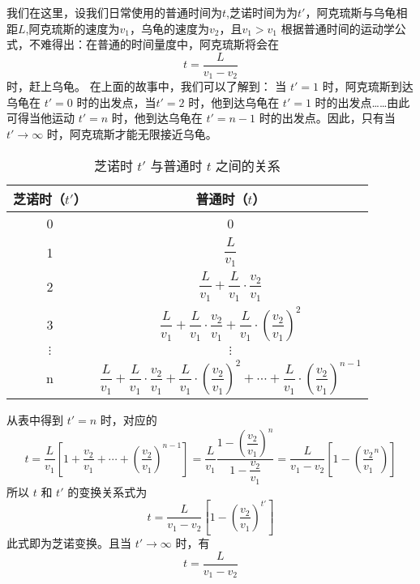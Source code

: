 我们在这里，设我们日常使用的普通时间为$t$,芝诺时间为为$t'$，阿克琉斯与乌龟相距$L$,阿克琉斯的速度为$v_1$，乌龟的速度为$v_2$，且$v_1>v_1$
根据普通时间的运动学公式，不难得出：在普通的时间量度中，阿克琉斯将会在
\begin{equation}
t = \dfrac{L}{v_1 - v_2}
\end{equation}
时，赶上乌龟。
在上面的故事中，我们可以了解到：
当 $t'=1$ 时，阿克琉斯到达乌龟在 $t'=0$ 时的出发点，当$t'=2$ 时，他到达乌龟在 $t'=1$ 时的出发点……由此可得当他运动 $t'=n$ 时，他到达乌龟在 $t'=n-1$ 时的出发点。因此，只有当 $t'\to\infty$ 时，阿克琉斯才能无限接近乌龟。\begin{table}[ht]
\centering
\caption{芝诺时 $t'$ 与普通时 $t$ 之间的关系}\label{zeno_tab1}
\begin{tabular}{|c|c|}
\hline
芝诺时（$t'$） & 普通时（$t$） \\
\hline
0 & 0 \\
\hline
1 & $\dfrac{L}{v_1}$ \\
\hline
2 & $\dfrac{L}{v_1}+\dfrac{L}{v_1}\cdot\dfrac{v_2}{v_1}$ \\
\hline
3 & $\dfrac{L}{v_1}+\dfrac{L}{v_1}\cdot\dfrac{v_2}{v_1}+\dfrac{L}{v_1}\cdot(\dfrac{v_2}{v_1})^2$ \\
\hline
$\vdots$ & $\vdots$ \\
\hline
n & $\dfrac{L}{v_1}+\dfrac{L}{v_1}\cdot\dfrac{v_2}{v_1}+\dfrac{L}{v_1}\cdot(\dfrac{v_2}{v_1})^2+\cdots+\dfrac{L}{v_1}\cdot(\dfrac{v_2}{v_1})^{n-1}$ \\
\hline
\end{tabular}
\end{table}
从表中得到 $t'=n$ 时，对应的
\begin{equation}
t=\dfrac{L}{v_1}[1+\dfrac{v_2}{v_1}+\cdots+(\dfrac{v_2}{v_1})^{n-1}]=\dfrac{L}{v_1}\dfrac{1-(\dfrac{v_2}{v_1})^n}{1-\dfrac{v_2}{v_1}}=\dfrac{L}{v_1-v_2}[1-(\dfrac{v_2}{v_1}^n)]
\end{equation}
所以 $t$ 和 $t'$ 的变换关系式为
\begin{equation}
t=\dfrac{L}{v_1-v_2}[1-(\dfrac{v_2}{v_1})^{t'}]
\end{equation}
此式即为芝诺变换。且当 $t'\to\infty$ 时，有
\begin{equation}
t=\dfrac{L}{v_1-v_2}
\end{equation}